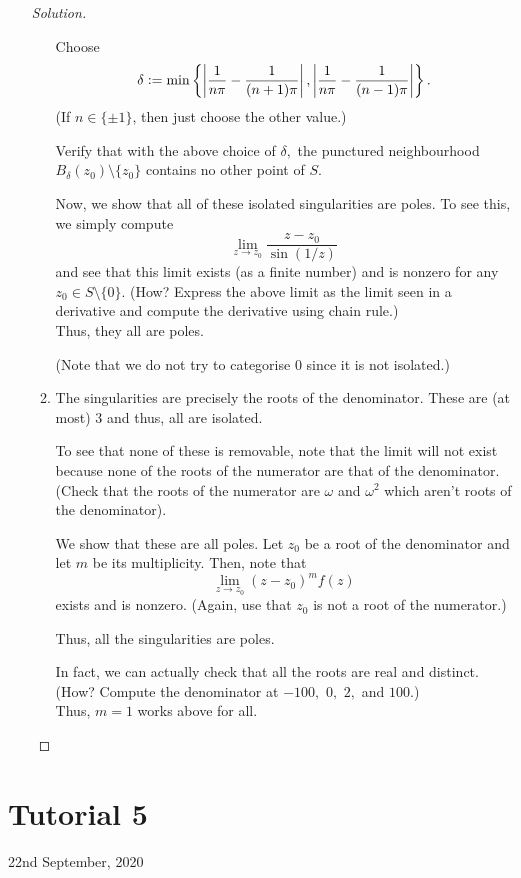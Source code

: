 \documentclass[12pt]{article}
\theoremstyle{definition}
\newenvironment{soln}{\begin{proof}[Solution]}{\end{proof}}
\begin{document}
\begin{enumerate}[leftmargin=*]
\begin{soln}
\begin{enumerate}
			Choose 
			\begin{equation*} 
				\delta \vcentcolon= \min\left\{\left|\dfrac{1}{n\pi} - \dfrac{1}{(n + 1)\pi}\right|, \left|\dfrac{1}{n\pi} - \dfrac{1}{(n - 1)\pi}\right|\right\}.
			\end{equation*}
			(If $n \in \{\pm1\}$, then just choose the other value.)

			Verify that with the above choice of $\delta,$ the punctured neighbourhood $B_\delta(z_0)\setminus\{z_0\}$ contains no other point of $S.$

			Now, we show that all of these isolated singularities are poles. To see this, we simply compute
			\begin{equation*} 
				\lim_{z\to z_0}\dfrac{z - z_0}{\sin(1/z)}
			\end{equation*}
			and see that this limit exists (as a finite number) and is nonzero for any $z_0 \in S\setminus\{0\}.$ (How? Express the above limit as the limit seen in a derivative and compute the derivative using chain rule.) \\
			Thus, they all are poles.

			(Note that we do not try to categorise $0$ since it is not isolated.)
			\item The singularities are precisely the roots of the denominator. These are (at most) $3$ and thus, all are isolated.

			To see that none of these is removable, note that the limit will not exist because none of the roots of the numerator are that of the denominator. (Check that the roots of the numerator are $\omega$ and $\omega^2$ which aren't roots of the denominator).

			We show that these are all poles. Let $z_0$ be a root of the denominator and let $m$ be its multiplicity. Then, note that
			\begin{equation*} 
				\lim_{z\to z_0}(z - z_0)^mf(z)
			\end{equation*}
			exists and is nonzero. (Again, use that $z_0$ is not a root of the numerator.)

			Thus, all the singularities are poles.

			In fact, we can actually check that all the roots are real and distinct. (How? Compute the denominator at $-100,$ $0,$ $2,$ and $100.$) \\
			Thus, $m = 1$ works above for all. \qedhere
		\end{enumerate}
	\end{soln}
\end{enumerate}
%
%
%
%
\newpage\section{Tutorial 5}
\begin{center}
	22nd September, 2020
\end{center}
\end{document}
